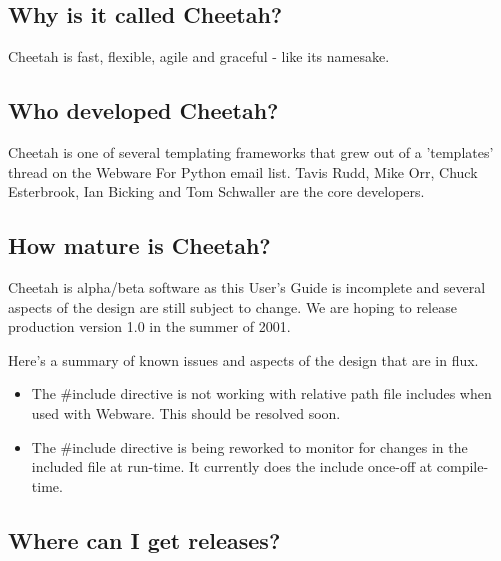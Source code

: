 \subsection{Why is it called Cheetah?}
\label{intro.name}

Cheetah is fast, flexible, agile and graceful - like its namesake. 



\subsection{Who developed Cheetah?}
\label{intro.developers}

Cheetah is one of several templating frameworks that grew out of a 'templates'
thread on the Webware For Python email list.  Tavis Rudd, Mike Orr, Chuck
Esterbrook, Ian Bicking and Tom Schwaller are the core developers.

\subsection{How mature is Cheetah?}
\label{intro.mature}

Cheetah is alpha/beta software as this User's Guide is incomplete and several
aspects of the design are still subject to change. We are hoping to release
production version 1.0 in the summer of 2001.

Here's a summary of known issues and aspects of the design that are in flux.
\begin{itemize}
\item The \#include directive is not working with relative path file includes
     when used with Webware. This should be resolved soon.
\item The \#include directive is being reworked to monitor for changes in the
     included file at run-time. It currently does the include once-off at
     compile-time.
\end{itemize}

\subsection{Where can I get releases?}
\label{intro.releases}

